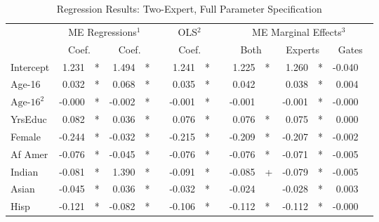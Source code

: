 \documentclass[12pt]{article}
\begin{document}
\begin{landscape}
\begin{table} \centering
  \caption{Regression Results: Two-Expert, Full Parameter Specification}
    \begin{threeparttable}
      \begin{tabular}[l]{l r l r l c r l c r l r l r l}

\cmidrule{1-15}
& \multicolumn{4}{c}{ME Regressions$^{1}$} &&  \multicolumn{2}{c}{OLS$^{2}$} && \multicolumn{6}{c}{ME Marginal Effects$^{3}$} \\
\cmidrule(l){2-5}    \cmidrule(l){7-8}     \cmidrule(l){10-15}
& \multicolumn{2}{c}{Coef.} &  \multicolumn{2}{c}{Coef.}  && \multicolumn{2}{c}{Coef.} && \multicolumn{2}{c}{Both}    &  \multicolumn{2}{c}{Experts}  &  \multicolumn{2}{c}{Gates} \\
                \cmidrule(l){2-3} \cmidrule(l){4-5} \cmidrule(l){7-8} \cmidrule(l){10-11} \cmidrule(l){12-13} \cmidrule(l){14-15}
Intercept              &  1.231 & *      &  1.494 & *     &&  1.241 & *     &&  1.225 & *        &  1.260 & *        & -0.040 &        \\
Age-16                 &  0.032 & *      &  0.068 & *     &&  0.035 & *     &&  0.042 &          &  0.038 & *        &  0.004 &        \\
$\textrm{Age-16}^{2}$  & -0.000 & *      & -0.002 & *     && -0.001 & *     && -0.001 &          & -0.001 & *        & -0.000 &        \\
YrsEduc                &  0.082 & *      &  0.036 & *     &&  0.076 & *     &&  0.076 & *        &  0.075 & *        &  0.000 &        \\
Female                 & -0.244 & *      & -0.032 & *     && -0.215 & *     && -0.209 & *        & -0.207 & *        & -0.002 &        \\
Af Amer                & -0.076 & *      & -0.045 & *     && -0.076 & *     && -0.076 & *        & -0.071 & *        & -0.005 &        \\
Indian                 & -0.081 & *      &  1.390 & *     && -0.091 & *     && -0.085 & +        & -0.079 & *        & -0.005 &        \\
Asian                  & -0.045 & *      &  0.036 & *     && -0.032 & *     && -0.024 &          & -0.028 & *        &  0.003 &        \\
Hisp                   & -0.121 & *      & -0.082 & *     && -0.106 & *     && -0.112 & *        & -0.112 & *        & -0.000 &        \\

\end{tabular}
\end{threeparttable}
\end{table}
\end{landscape}
\end{document}
